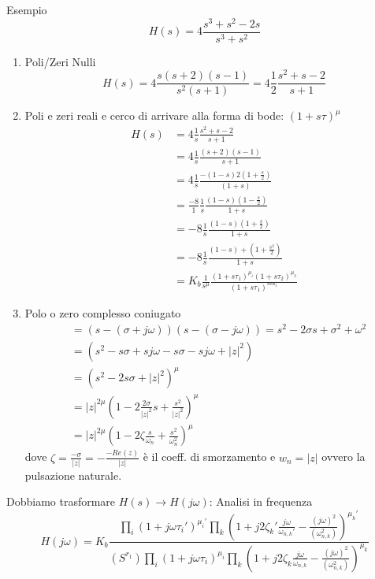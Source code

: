 \documentclass[a4paper]{article}
\begin{document}
\begin{examplebox}{Esempio}
    \[H(s) = 4\frac{s^3+s^2-2s}{s^3+s^2}\]
    \begin{enumerate}
        \item Poli/Zeri Nulli
        \[H(s) = 4 \frac{s(s+2)(s-1)}{s^2(s+1)} = 4 \frac{1}{2} \frac{s^2+s-2}{s+1}\]
        \item Poli e zeri reali e cerco di arrivare alla forma di bode: $(1 + s\tau)^{\mu}$
        \begin{align*}
            H(s) &= 4\frac{1}{s}\frac{s^2+s-2}{s+1}\\
            &= 4\frac{1}{s}\frac{(s+2)(s-1)}{s+1}\\
            &= 4\frac{1}{s} \frac{-(1 - s)2\left(1 + \frac{s}{2}\right)}{(1 + s)} \\
            &= \frac{-8}{1} \frac{1}{s} \frac{(1-s)\left(1-\frac{s}{2}\right)}{1+s}\\
            &= -8 \frac{1}{s} \frac{(1-s)\left(1 + \frac{s}{2}\right)}{1+s}\\
            &= -8 \frac{1}{s} \frac{(1 - s) + \left(1 + \frac{s^2}{2}\right)}{1+s}\\
            &= K_b \frac{1}{s^\mu} \frac{(1+s\tau_1)^{\mu_i} (1+s\tau_2)^{\mu_2}}{(1+s\tau_1)^{mu_1}}
        \end{align*}
        \item Polo o zero complesso coniugato
        \begin{align*}
            &= (s-(\sigma + j\omega))(s-(\sigma - j\omega)) = s^2 - 2\sigma s + \sigma^2 + \omega^2\\
            &= (s^2-s\sigma + sj\omega - s\sigma - sj\omega + |z|^2)\\
            &= (s^2 - 2s\sigma + |z|^2)^\mu\\
            &= |z|^{2\mu} \left(1 - 2\frac{2\sigma}{|z|^2}s + \frac{s^2}{|z|^2}\right)^\mu\\
            &= |z|^{2\mu} \left(1 -2\zeta\frac{s}{\omega_n} + \frac{s^2}{\omega_n^2}\right)^\mu
        \end{align*}
        dove $\zeta = \frac{-\sigma}{|z|} = -\frac{-Re(z)}{|z|}$ è il coeff. di smorzamento e $w_n = |z|$ ovvero la pulsazione naturale.
    \end{enumerate}
\end{examplebox}
\noindent
Dobbiamo trasformare $H(s) \rightarrow H(j\omega)$: Analisi in frequenza
\[H(j\omega) = K_b \frac{\prod_i (1 + j\omega\tau_i')^{\mu_i'} \prod_k \left(1 + j2\zeta_k' \frac{j\omega}{\omega_{n,k}'} - \frac{(j\omega)^2}{(\omega_{n,k}^2)}\right)^{\mu_k'}}{(S^{r_1})\prod_i (1 + j\omega\tau_i)^{\mu_i} \prod_k \left(1 + j2\zeta_k \frac{j\omega}{\omega_{n,k}} - \frac{(j\omega)^2}{(\omega_{n,k}^2)}\right)^{\mu_k}}\]
\end{document}
